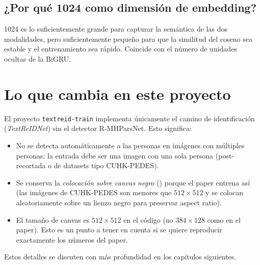 \subsection*{¿Por qué 1024 como dimensión de embedding?}

1024 es lo suficientemente grande para capturar la semántica de
las dos modalidades, pero suficientemente pequeño para que la
similitud del coseno sea estable y el entrenamiento sea rápido.
Coincide con el número de unidades ocultas de la BiGRU.

\section{Lo que cambia en este proyecto}

El proyecto \texttt{textreid-train} implementa únicamente el
camino de identificación (\emph{TextReIDNet}) sin el detector
R-MHParsNet. Esto significa:

\begin{itemize}
  \item No se detecta automáticamente a las personas en imágenes
        con múltiples personas: la entrada debe ser una imagen con
        una sola persona (post-recortada o de datasets tipo
        CUHK-PEDES).
  \item Se conserva la \emph{colocación sobre canvas negro}
        () porque el paper entrena
        así (las imágenes de CUHK-PEDES son menores que $512
        \times 512$ y se colocan aleatoriamente sobre un lienzo
        negro para preservar aspect ratio).
  \item El tamaño de canvas es $512 \times 512$ en el código
        (no $384 \times 128$ como en el paper). Esto es un punto
        a tener en cuenta si se quiere reproducir exactamente los
        números del paper.
\end{itemize}

Estos detalles se discuten con más profundidad en los capítulos
siguientes.
